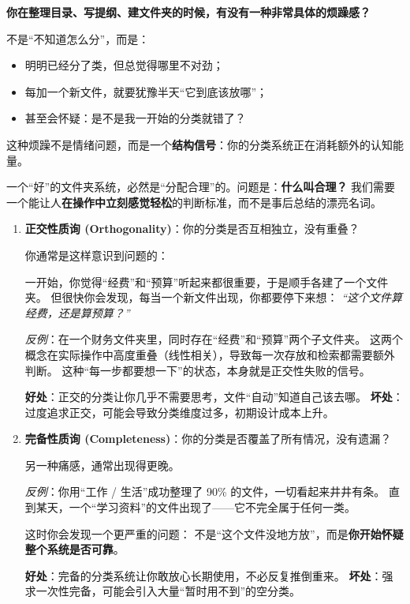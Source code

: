 \documentclass[11pt, a4paper]{ctexart}
\begin{document}
\textbf{你在整理目录、写提纲、建文件夹的时候，有没有一种非常具体的烦躁感？}

不是“不知道怎么分”，而是：
\begin{itemize}
	\item 明明已经分了类，但总觉得哪里不对劲；
	\item 每加一个新文件，就要犹豫半天“它到底该放哪”；
	\item 甚至会怀疑：是不是我一开始的分类就错了？
\end{itemize}

这种烦躁不是情绪问题，而是一个\textbf{结构信号}：你的分类系统正在消耗额外的认知能量。

一个“好”的文件夹系统，必然是“分配合理”的。问题是：\textbf{什么叫合理？}
我们需要一个能让人\textbf{在操作中立刻感觉轻松}的判断标准，而不是事后总结的漂亮名词。

\begin{enumerate}
	\item \textbf{正交性质询 (Orthogonality)}：你的分类是否互相独立，没有重叠？
	
	你通常是这样意识到问题的：
	
	一开始，你觉得“经费”和“预算”听起来都很重要，于是顺手各建了一个文件夹。
	但很快你会发现，每当一个新文件出现，你都要停下来想：
	\emph{“这个文件算经费，还是算预算？”}
	
	\textit{反例}：在一个财务文件夹里，同时存在“经费”和“预算”两个子文件夹。
	这两个概念在实际操作中高度重叠（线性相关），导致每一次存放和检索都需要额外判断。
	这种“每一步都要想一下”的状态，本身就是正交性失败的信号。
	
	\textbf{好处}：正交的分类让你几乎不需要思考，文件“自动”知道自己该去哪。  
	\textbf{坏处}：过度追求正交，可能会导致分类维度过多，初期设计成本上升。
	
	\item \textbf{完备性质询 (Completeness)}：你的分类是否覆盖了所有情况，没有遗漏？
	
	另一种痛感，通常出现得更晚。
	
	\textit{反例}：你用“工作 / 生活”成功整理了 90\% 的文件，一切看起来井井有条。
	直到某天，一个“学习资料”的文件出现了——它不完全属于任何一类。
	
	这时你会发现一个更严重的问题：
	不是“这个文件没地方放”，而是\textbf{你开始怀疑整个系统是否可靠}。
	
	\textbf{好处}：完备的分类系统让你敢放心长期使用，不必反复推倒重来。  
	\textbf{坏处}：强求一次性完备，可能会引入大量“暂时用不到”的空分类。
\end{enumerate}
\end{document}

